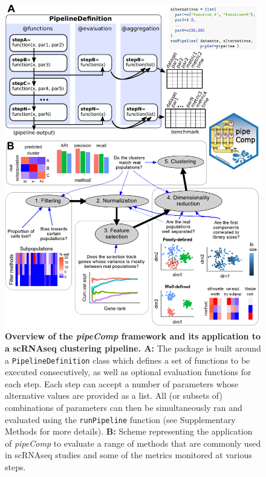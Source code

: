 \documentclass[11pt]{article}
\begin{document}
\begin{backmatter}
\begin{figure}
    \centering
    \includegraphics[width=\textwidth, keepaspectratio]{main_figures/pipeline_explanation.pdf}
    \caption{\textbf{Overview of the \textit{pipeComp} framework and its application to a scRNAseq clustering pipeline. A:} The package is built around a \texttt{PipelineDefinition} class which defines a set of functions to be executed consecutively, as well as optional evaluation functions for each step. Each step can accept a number of parameters whose alternative values are provided as a list. All (or subsets of) combinations of parameters can then be simultaneously ran and evaluated using the \texttt{runPipeline} function (see Supplementary Methods for more details). \textbf{B:} Scheme representing the application of \textit{pipeComp} to evaluate a range of methods that are commonly used in scRNAseq studies and some of the metrics monitored at various steps.}
    \label{fig:explanation}
\end{figure}



\end{backmatter}
\end{document}
